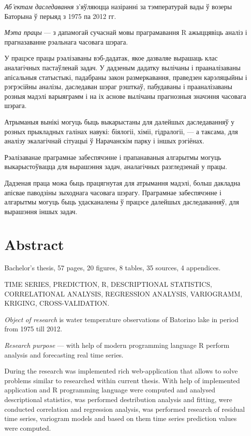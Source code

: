 \textit{Аб'ектам даследавання} з'яўляюцца назіранні за тэмпературай вады ў возеры Баторына ў перыяд з 1975 па 2012 гг.

\textit{Мэта працы} --- з дапамогай сучаснай мовы праграмавання R ажыццявіць аналіз і прагназаванне рэальнага часовага шэрага.

У працэсе працы рэалізаваны вэб-дадатак, якое дазваляе вырашаць клас аналагічных пастаўленай задач. У дадзеным дадатку вылічаны і прааналізаваны апісальныя статыстыкі, падабраны закон размеркавання, праведзен карэляцыйны і рэгрэсійны аналізы, даследаван шэраг рэшткаў, пабудаваны і прааналізаваны розныя мадэлі варыяграмм і на іх аснове вылічаны прагнозныя значэння часовага шэрага.

Атрыманыя вынікі могуць быць выкарыстаны для далейшых даследаванняў у розных прыкладных галінах навукі: біялогіі, хіміі, гідралогіі, --- а таксама, для аналізу экалагічнай сітуацыі ў Нарачанскім парку і іншых рэгіёнах.

Рэалізаванае праграмнае забеспячэнне і прапанаваныя алгарытмы могуць выкарыстоўвацца для вырашэння задач, аналагічных разгледзенай у працы.

Дадзеная праца можа быць працягнутая для атрымання мадэлі, больш дакладна апісвае паводзіны зыходнага часовага шэрагу. Праграмнае забеспячэнне і алгарытмы могуць быць удасканалены ў працэсе далейшых даследаванняў, для вырашэння іншых задач.

\newpage

\chapter*{Abstract}
Bachelor's thesis, 57 pages, 20 figures, 8 tables, 35 sources, 4 appendices.

TIME SERIES, PREDICTION, R, DESCRIPTIONAL STATISTICS, CORRELATIONAL ANALYSIS, REGRESSION ANALYSIS, VARIOGRAMM, KRIGING, CROSS-VALIDATION.

\textit{Object of research} is water temperature observations of Batorino lake in period from 1975 till 2012.

\textit{Research purpose} --- with help of modern programming language R perform analysis and forecasting real time series.

During the research was implemented rich web-application that allows to solve problems similar to researched within current thesis. With help of implemented application and R programming language were computed and analysed descriptional statistics, was performed destribution analysis and fitting, were conducted correlation and regression analysis, was performed research of residual time series, variogram models and based on them time series prediction values were computed.

